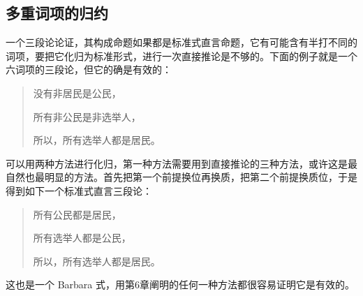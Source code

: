 \subsection{多重词项的归约}
一个三段论论证，其构成命题如果都是标准式直言命题，它有可能含有半打不同的词项，要把它化归为标准形式，进行一次直接推论是不够的。下面的例子就是一个六词项的三段论，但它的确是有效的：

\begin{quote}
没有非居民是公民，

所有非公民是非选举人，

所以，所有选举人都是居民。
\end{quote}

可以用两种方法进行化归，第一种方法需要用到直接推论的三种方法，或许这是最自然也最明显的方法。首先把第一个前提换位再换质，把第二个前提换质位，于是得到如下一个标准式直言三段论：

\begin{quote}
所有公民都是居民，

所有选举人都是公民，

所以，所有选举人都是居民。
\end{quote}

这也是一个 Barbara 式，用第6章阐明的任何一种方法都很容易证明它是有效的。

\begin{center}
\end{center}